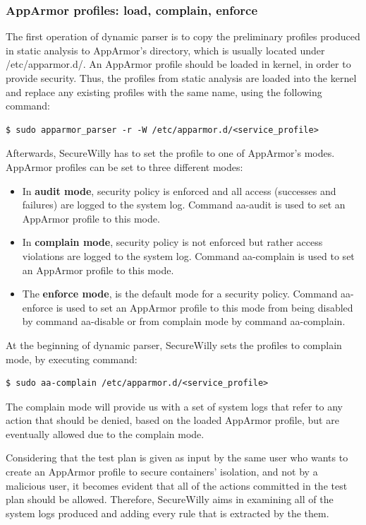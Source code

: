 \subsubsection{AppArmor profiles: load, complain, enforce}
The first operation of dynamic parser is to copy the preliminary profiles produced in static analysis to AppArmor's directory, which is usually located under /etc/apparmor.d/. An AppArmor profile should be loaded in kernel, in order to provide security. Thus, the profiles from static analysis are loaded into the kernel and replace any existing profiles with the same name, using the following command:

\begin{lstlisting}[style=dockercommands]
$ sudo apparmor_parser -r -W /etc/apparmor.d/<service_profile>
\end{lstlisting}

Afterwards, SecureWilly has to set the profile to one of AppArmor's modes. AppArmor profiles can be set to three different modes:

\begin{itemize}
\item In \textbf{audit mode}, security policy is enforced and all access (successes and failures) are logged to the system log. Command aa-audit is used to set an AppArmor profile to this mode.
\item In \textbf{complain mode}, security policy is not enforced but rather access violations are logged to the system log. Command aa-complain is used to set an AppArmor profile to this mode.
\item The \textbf{enforce mode}, is the default mode for a security policy. Command aa-enforce is used to set an AppArmor profile to this mode from being disabled by command aa-disable or from complain mode by command aa-complain.
\end{itemize}

At the beginning of dynamic parser, SecureWilly sets the profiles to complain mode, by executing command:
\begin{lstlisting}[style=dockercommands]
$ sudo aa-complain /etc/apparmor.d/<service_profile>
\end{lstlisting}

The complain mode will provide us with a set of system logs that refer to any action that should be denied, based on the loaded AppArmor profile, but are eventually allowed due to the complain mode.

Considering that the test plan is given as input by the same user who wants to create an AppArmor profile to secure containers' isolation, and not by a malicious user, it becomes evident that all of the actions committed in the test plan should be allowed. Therefore, SecureWilly aims in examining all of the system logs produced and adding every rule that is extracted by the them.

